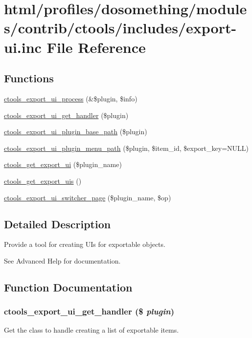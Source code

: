 \hypertarget{export-ui_8inc}{
\section{html/profiles/dosomething/modules/contrib/ctools/includes/export-\/ui.inc File Reference}
\label{export-ui_8inc}
}
\subsection*{Functions}
\begin{DoxyCompactItemize}
\item 
\hyperlink{export-ui_8inc_a8d8ff38dc4b5e320df5f56ddb7869c7e}{ctools\_\-export\_\-ui\_\-process} (\&\$plugin, \$info)
\item 
\hyperlink{export-ui_8inc_aa35d7252ae737b50c96bcac32eb81801}{ctools\_\-export\_\-ui\_\-get\_\-handler} (\$plugin)
\item 
\hyperlink{export-ui_8inc_a94d99f3e0f94a8263e97b182214bdf6a}{ctools\_\-export\_\-ui\_\-plugin\_\-base\_\-path} (\$plugin)
\item 
\hyperlink{export-ui_8inc_ab235aba2e08d3bad82db3f42a7fd6d42}{ctools\_\-export\_\-ui\_\-plugin\_\-menu\_\-path} (\$plugin, \$item\_\-id, \$export\_\-key=NULL)
\item 
\hyperlink{export-ui_8inc_a63e2d31a77d34f020fc79e74e0c3bdcd}{ctools\_\-get\_\-export\_\-ui} (\$plugin\_\-name)
\item 
\hyperlink{export-ui_8inc_a8212c89203edba98701c590094409cef}{ctools\_\-get\_\-export\_\-uis} ()
\item 
\hyperlink{export-ui_8inc_af3315a21d2e02ce4637e2a2c71710c9b}{ctools\_\-export\_\-ui\_\-switcher\_\-page} (\$plugin\_\-name, \$op)
\end{DoxyCompactItemize}


\subsection{Detailed Description}
Provide a tool for creating UIs for exportable objects.

See Advanced Help for documentation. 

\subsection{Function Documentation}
\hypertarget{export-ui_8inc_aa35d7252ae737b50c96bcac32eb81801}{
\subsubsection[{ctools\_\-export\_\-ui\_\-get\_\-handler}]{\setlength{\rightskip}{0pt plus 5cm}ctools\_\-export\_\-ui\_\-get\_\-handler (\$ {\em plugin})}}
\label{export-ui_8inc_aa35d7252ae737b50c96bcac32eb81801}
Get the class to handle creating a list of exportable items.

